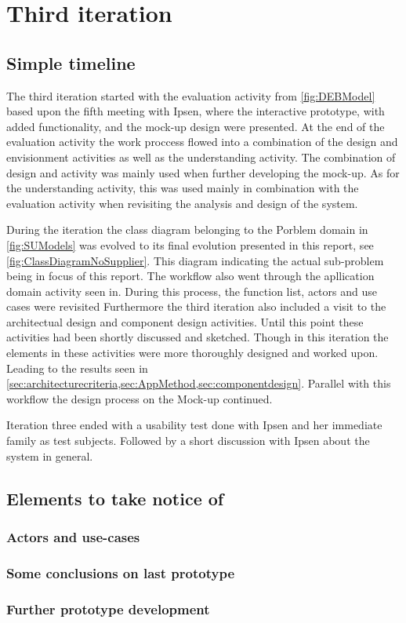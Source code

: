 \section{Third iteration}
\subsection{Simple timeline}\label{sec:3Iteration-timeline}
The third iteration started with the evaluation activity from \cref{fig:DEBModel} based upon the fifth meeting with Ipsen, where the interactive prototype, with added functionality, and the mock-up design were presented.
At the end of the evaluation activity the work proccess flowed into a combination of the design and envisionment activities as well as the understanding activity.
The combination of design and activity was mainly used when further developing the mock-up.
As for the understanding activity, this was used mainly in combination with the evaluation activity when revisiting the analysis and design of the system.

During the iteration the class diagram belonging to the Porblem domain in \cref{fig:SUModels} was evolved to its final evolution presented in this report, see \cref{fig:ClassDiagramNoSupplier}.
This diagram indicating the actual sub-problem being in focus of this report.
The workflow also went through the apllication domain activity seen in. 
During this process, the function list, actors and use cases were revisited 
Furthermore the third iteration also included a visit to the architectual design and component design activities.
Until this point these activities had been shortly discussed and sketched.
Though in this iteration the elements in these activities were more thoroughly designed and worked upon.
Leading to the results seen in \cref{sec:architecturecriteria,sec:AppMethod,sec:componentdesign}.
Parallel with this workflow the design process on the Mock-up continued.

Iteration three ended with a usability test done with Ipsen and her immediate family as test subjects. 
Followed by a short discussion with Ipsen about the system in general.



\subsection{Elements to take notice of}
\subsubsection*{Actors and use-cases}
\subsubsection*{Some conclusions on last prototype}

\subsubsection*{Further prototype development}